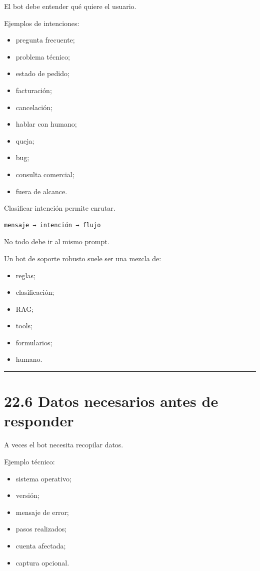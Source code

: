 El bot debe entender qué quiere el usuario.

Ejemplos de intenciones:

\begin{itemize}
\tightlist
\item
  pregunta frecuente;
\item
  problema técnico;
\item
  estado de pedido;
\item
  facturación;
\item
  cancelación;
\item
  hablar con humano;
\item
  queja;
\item
  bug;
\item
  consulta comercial;
\item
  fuera de alcance.
\end{itemize}

Clasificar intención permite enrutar.

\begin{lstlisting}
mensaje → intención → flujo
\end{lstlisting}

No todo debe ir al mismo prompt.

Un bot de soporte robusto suele ser una mezcla de:

\begin{itemize}
\tightlist
\item
  reglas;
\item
  clasificación;
\item
  RAG;
\item
  tools;
\item
  formularios;
\item
  humano.
\end{itemize}

\begin{center}\rule{0.5\linewidth}{0.5pt}\end{center}

\section{22.6 Datos necesarios antes de
responder}\label{datos-necesarios-antes-de-responder}

A veces el bot necesita recopilar datos.

Ejemplo técnico:

\begin{itemize}
\tightlist
\item
  sistema operativo;
\item
  versión;
\item
  mensaje de error;
\item
  pasos realizados;
\item
  cuenta afectada;
\item
  captura opcional.
\end{itemize}

